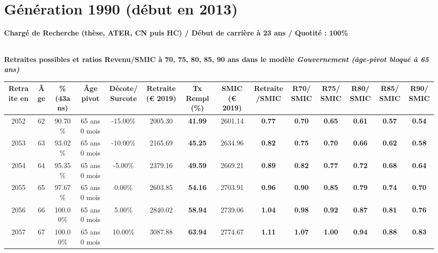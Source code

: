 \newpage 
 
\section{Génération 1990 (début en 2013)\label{CR_100_1990_23_0}} 
 
{\bf \noindent Chargé de Recherche (thèse, ATER, CN puis HC) / Début de carrière à 23 ans / Quotité : 100\%}  ~ 

 ~\\{\bf \noindent Retraites possibles et ratios Revenu/SMIC à 70, 75, 80, 85, 90 ans dans le modèle \emph{Gouvernement (âge-pivot bloqué à 65 ans)}}  
 
\begin{adjustbox}{max width=\textwidth} 
\begin{tabular}[htb]{|c|c||c|c|c||c|c||c|c||c|c|c|c|c|} 
\hline 
 Retraite en &  Âge &  \%(43ans) &  Âge pivot &  Décote/Surcote &  Retraite (\euro{} 2019) &  Tx Rempl(\%) &  SMIC (\euro{} 2019) &  Retraite/SMIC &  R70/SMIC &  R75/SMIC &  R80/SMIC &  R85/SMIC &  R90/SMIC \\ 
\hline \hline 
 2052 &  62 &  90.70\% &  65 ans 0 mois &  -15.00\% &  2005.30 &  {\bf 41.99} &  2601.14 &  {\bf {\color{red} 0.77}} &  {\bf {\color{red} 0.70}} &  {\bf {\color{red} 0.65}} &  {\bf {\color{red} 0.61}} &  {\bf {\color{red} 0.57}} &  {\bf {\color{red} 0.54}} \\ 
\hline 
 2053 &  63 &  93.02\% &  65 ans 0 mois &  -10.00\% &  2165.69 &  {\bf 45.25} &  2634.96 &  {\bf {\color{red} 0.82}} &  {\bf {\color{red} 0.75}} &  {\bf {\color{red} 0.70}} &  {\bf {\color{red} 0.66}} &  {\bf {\color{red} 0.62}} &  {\bf {\color{red} 0.58}} \\ 
\hline 
 2054 &  64 &  95.35\% &  65 ans 0 mois &  -5.00\% &  2379.16 &  {\bf 49.59} &  2669.21 &  {\bf {\color{red} 0.89}} &  {\bf {\color{red} 0.82}} &  {\bf {\color{red} 0.77}} &  {\bf {\color{red} 0.72}} &  {\bf {\color{red} 0.68}} &  {\bf {\color{red} 0.64}} \\ 
\hline 
 2055 &  65 &  97.67\% &  65 ans 0 mois &  0.00\% &  2603.85 &  {\bf 54.16} &  2703.91 &  {\bf {\color{red} 0.96}} &  {\bf {\color{red} 0.90}} &  {\bf {\color{red} 0.85}} &  {\bf {\color{red} 0.79}} &  {\bf {\color{red} 0.74}} &  {\bf {\color{red} 0.70}} \\ 
\hline 
 2056 &  66 &  100.00\% &  65 ans 0 mois &  5.00\% &  2840.02 &  {\bf 58.94} &  2739.06 &  {\bf 1.04} &  {\bf {\color{red} 0.98}} &  {\bf {\color{red} 0.92}} &  {\bf {\color{red} 0.87}} &  {\bf {\color{red} 0.81}} &  {\bf {\color{red} 0.76}} \\ 
\hline 
 2057 &  67 &  100.00\% &  65 ans 0 mois &  10.00\% &  3087.88 &  {\bf 63.94} &  2774.67 &  {\bf 1.11} &  {\bf 1.07} &  {\bf 1.00} &  {\bf {\color{red} 0.94}} &  {\bf {\color{red} 0.88}} &  {\bf {\color{red} 0.83}} \\ 
\hline 
\hline 
\end{tabular} 
\end{adjustbox} 
 
